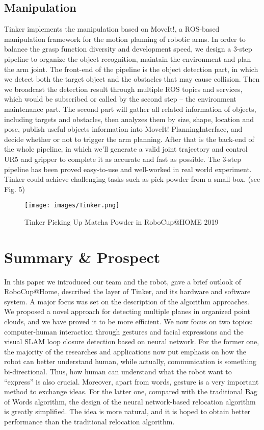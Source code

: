 \documentclass[runningheads,UTF8,fntef,a4paper]{llncs}
\begin{document}
\subsection{Manipulation}
Tinker implements the manipulation based on MoveIt!, a ROS-based manipulation framework for the motion planning of robotic arms. In order to balance the grasp function diversity and development speed, we design a 3-step pipeline to organize the object recognition, maintain the environment and plan the arm joint.
The front-end of the pipeline is the object detection part, in which we detect both the target object and the obstacles that may cause collision. Then we broadcast the detection result through multiple ROS topics and services, which would be subscribed or called by the second step -- the environment maintenance part. The second part will gather all related information of objects, including targets and obstacles, then analyzes them by size, shape, location and pose, publish useful objects information into MoveIt! PlanningInterface, and decide whether or not to trigger the arm planning. After that is the back-end of the whole pipeline, in which we’ll generate a valid joint trajectory and control UR5 and gripper to complete it as accurate and fast as possible.
The 3-step pipeline has been proved easy-to-use and well-worked in real world experiment. Tinker could achieve challenging tasks such as pick powder from a small box. (see Fig. 5)
\begin{figure}[!t]
	\centering
	\texttt{[image: images/Tinker.png]}
	\caption{Tinker Picking Up Matcha Powder in RoboCup@HOME 2019}
	\label{Tinker}
\end{figure}

\section{Summary \& Prospect}
In this paper we introduced our team and the robot, gave a brief outlook of RoboCup@Home, described the layer of Tinker, and its hardware and software system. A major focus was set on the description of the algorithm approaches. We proposed a novel approach for detecting multiple planes in organized point clouds, and we have proved it to be more efficient. We now focus on two topics: computer-human interaction through gestures and facial expressions and the visual SLAM loop closure detection based on neural network. For the former one, the majority of the researches and applications now put emphasis on how the robot can better understand human, while actually, communication is something bi-directional. Thus, how human can understand what the robot want to “express” is also crucial. Moreover, apart from words, gesture is a very important method to exchange ideas. For the latter one, compared with the traditional Bag of Words algorithm, the design of the neural network-based relocation algorithm is greatly simplified. The idea is more natural, and it is hoped to obtain better performance than the traditional relocation algorithm. 
\end{document}
